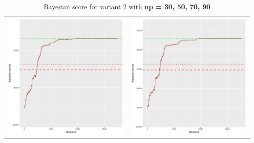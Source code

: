 \documentclass[]{scrartcl}
\begin{document}
\begin{table}[h!]
\begin{tabular}{cc}
\includegraphics[scale = 0.4]{./figs/alarm/v2/70/bayBoundsEvolution-3502.pdf} & 
\includegraphics[scale = 0.4]{./figs/alarm/v2/90/bayBoundsEvolution-3502.pdf} \\
\end{tabular}
\caption{Bayesian score for variant 2 with \textbf{np =  30, 50, 70, 90 }}
\end{table}
\end{document}
